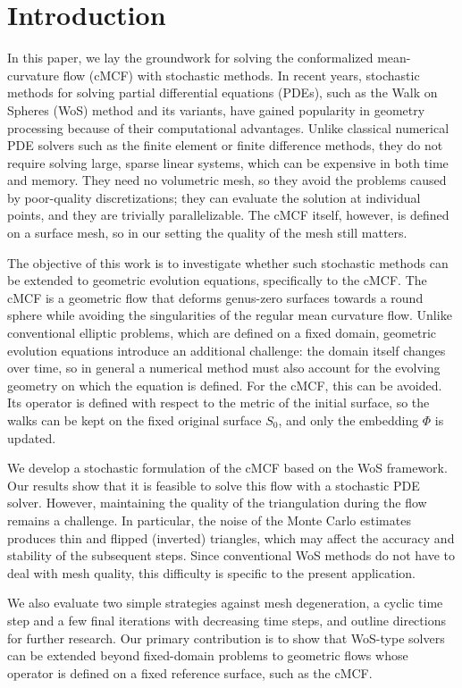 \documentclass[
]{elteiktdk}[2024/04/26]
\begin{document}
	\chapter{Introduction}
	\label{ch:intro}
	
	In this paper, we lay the groundwork for solving the conformalized mean-curvature flow (cMCF) with stochastic methods. In recent years, stochastic methods for solving partial differential equations (PDEs), such as the Walk on Spheres (WoS) method and its variants, have gained popularity in geometry processing because of their computational advantages. Unlike classical numerical PDE solvers such as the finite element or finite difference methods, they do not require solving large, sparse linear systems, which can be expensive in both time and memory. They need no volumetric mesh, so they avoid the problems caused by poor-quality discretizations; they can evaluate the solution at individual points, and they are trivially parallelizable. The cMCF itself, however, is defined on a surface mesh, so in our setting the quality of the mesh still matters.
	
	The objective of this work is to investigate whether such stochastic methods can be extended to geometric evolution equations, specifically to the cMCF. The cMCF is a geometric flow that deforms genus-zero surfaces towards a round sphere while avoiding the singularities of the regular mean curvature flow. Unlike conventional elliptic problems, which are defined on a fixed domain, geometric evolution equations introduce an additional challenge: the domain itself changes over time, so in general a numerical method must also account for the evolving geometry on which the equation is defined. For the cMCF, this can be avoided. Its operator is defined with respect to the metric of the initial surface, so the walks can be kept on the fixed original surface $S_0$, and only the embedding $\Phi$ is updated.
	
	We develop a stochastic formulation of the cMCF based on the WoS framework. Our results show that it is feasible to solve this flow with a stochastic PDE solver. However, maintaining the quality of the triangulation during the flow remains a challenge. In particular, the noise of the Monte Carlo estimates produces thin and flipped (inverted) triangles, which may affect the accuracy and stability of the subsequent steps. Since conventional WoS methods do not have to deal with mesh quality, this difficulty is specific to the present application.
	
	We also evaluate two simple strategies against mesh degeneration, a cyclic time step and a few final iterations with decreasing time steps, and outline directions for further research. Our primary contribution is to show that WoS-type solvers can be extended beyond fixed-domain problems to geometric flows whose operator is defined on a fixed reference surface, such as the cMCF.
	
\end{document}
